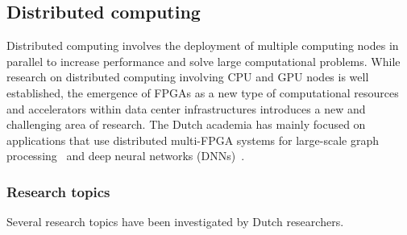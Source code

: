\subsection{Distributed computing}
\label{distcomp}

Distributed computing involves the deployment of multiple computing nodes in parallel to increase performance and solve large computational problems. %
While %
research on distributed computing involving CPU and GPU nodes is well established, %
the emergence of FPGAs %
as a new type of computational resources and accelerators within data center infrastructures introduces a new and challenging area of research. %
The Dutch academia has mainly focused on applications that use distributed multi-FPGA systems for %
large-scale graph processing~\cite{Sahebi2023DistributedFPGAs} and deep neural networks (DNNs)~\cite{Alonso2021Elastic-DF:Partitioning}.  

\subsubsection*{\bf{Research topics}}
Several research topics have been %
investigated by Dutch researchers. 

